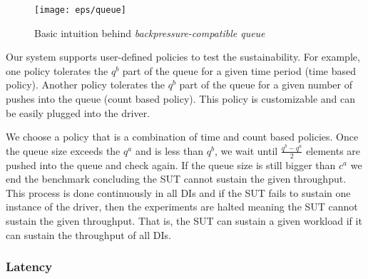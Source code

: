 
\begin{figure}[h]
\centering
\texttt{[image: eps/queue]}
\caption{Basic intuition behind \textit{backpressure-compatible queue}}
\label{fig_queue}
\end{figure}




Our system supports user-defined policies to test the sustainability. For example, one policy tolerates the $q^{b}$ part of the queue for a given time period (time based policy). Another policy tolerates   the $q^{b}$ part of the queue for a given number of pushes into the queue (count based policy).%
This policy is customizable and can be easily plugged into the driver. %

We choose a policy that is a combination of time and count based policies. Once the queue size exceeds the $q^{a}$ and is less than $q^{b}$, we wait until $\frac{q^{b} - q^{a}}{2}  $ elements are pushed into the queue and check again. If the queue size is still bigger than $c^{a}$ we end the benchmark concluding the SUT cannot sustain the given throughput. %
This process is done continuously in all DIs %
and if the SUT fails to sustain one instance of the driver, then the experiments are halted meaning the SUT cannot sustain the given throughput. That is, the SUT can sustain a given workload if it can sustain the throughput of all DIs.%








\subsubsection{Latency}
\label{sec_latency}

